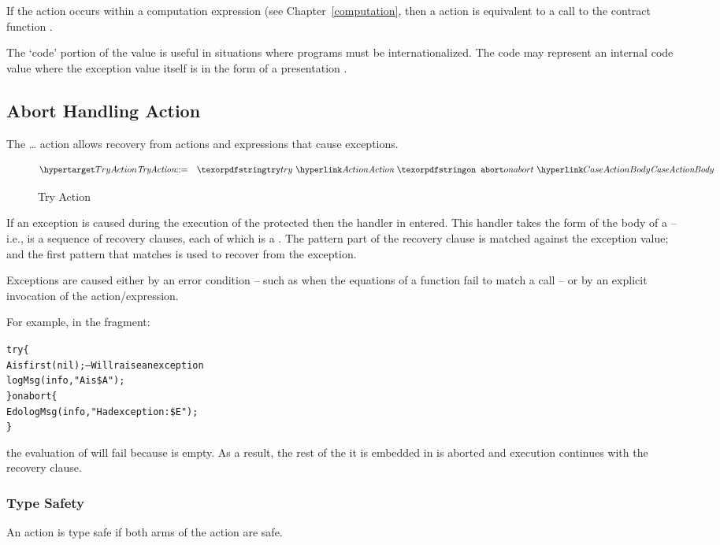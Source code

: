 \begin{aside}
If the  action occurs within a computation expression (see Chapter~\vref{computation}, then a  action is equivalent to a call to the contract function .
\end{aside}

\begin{aside}
The `code' portion of the  value is useful in situations where programs must be internationalized. The code may represent an internal code value where the exception value itself is in the form of a presentation .
\end{aside}

\subsection{Abort Handling Action}
\label{except}
The  \ldots{}  action allows recovery from actions and expressions that cause exceptions.
\begin{figure}[htbp]
\begin{eqnarray*}
\ntDef{TryAction}&\arrow&\q{try}\ \ntRef{Action}\ \q{on abort}\ \ntRef{CaseActionBody}
\end{eqnarray*}
\caption{Try Action}
\label{tryActionFig}
\end{figure}

If an exception is caused during the execution of the protected  then the handler in entered. This handler takes the form of the body of a  -- i.e., is a sequence of recovery clauses, each of which is a . The pattern part of the recovery clause is matched against the exception value; and the first pattern that matches is used to recover from the exception.

Exceptions are caused either by an error condition -- such as when the equations of a function fail to match a call -- or by an explicit invocation of the  action/expression.

For example, in the fragment:
\begin{alltt}
try\{
  A is first(nil); -- Will raise an exception
  logMsg(info,"A is \$A");
\} on abort \{
  E do logMsg(info,"Had exception: \$E");
\}
\end{alltt}
the evaluation of  will fail because  is empty. As a result, the rest of the  it is embedded in is aborted and execution continues with the recovery clause.

\subsubsection{Type Safety}
An  action is type safe if both arms of the action are safe.

\begin{prooftree}
\end{prooftree}
